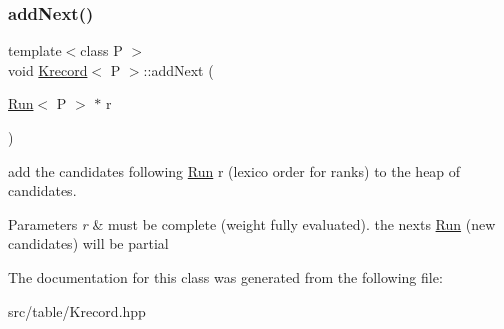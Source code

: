 \subsubsection{\texorpdfstring{addNext()}{addNext()}}
{\footnotesize\ttfamily template$<$class P $>$ \\
void \mbox{\hyperlink{classKrecord}{Krecord}}$<$ P $>$\+::add\+Next (\begin{DoxyParamCaption}\item[{\mbox{\hyperlink{classRun}{Run}}$<$ P $>$ $\ast$}]{r }\end{DoxyParamCaption})\hspace{0.3cm}{\ttfamily [protected]}}



add the candidates following \mbox{\hyperlink{classRun}{Run}} r (lexico order for ranks) to the heap of candidates. 


\begin{DoxyParams}{Parameters}
{\em r} & must be complete (weight fully evaluated). the nexts \mbox{\hyperlink{classRun}{Run}} (new candidates) will be partial \\
\hline
\end{DoxyParams}


The documentation for this class was generated from the following file\+:\begin{DoxyCompactItemize}
\item 
src/table/Krecord.\+hpp\end{DoxyCompactItemize}
